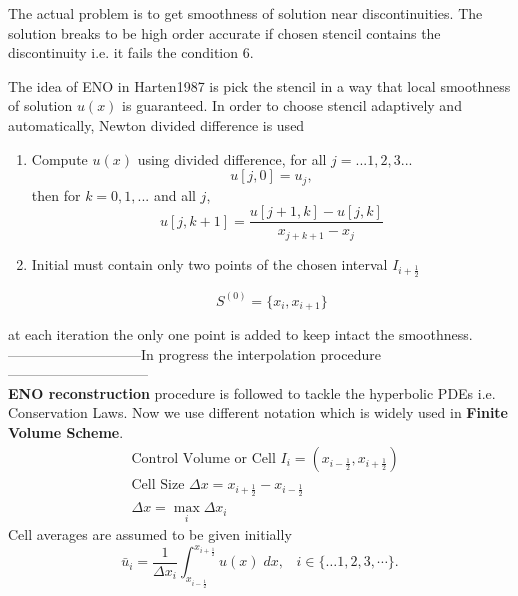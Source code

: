 \documentclass{article}
\begin{document}
\noindent The actual problem is to get smoothness of solution near discontinuities. The solution breaks to be high order accurate if chosen stencil contains the discontinuity i.e. it fails the condition 6.

\noindent The idea of ENO in Harten1987 is pick the stencil in a way that local smoothness of solution $u(x)$ is guaranteed. In order to choose stencil adaptively and automatically, Newton divided difference is used

\begin{enumerate}
    \item Compute $u(x)$ using divided difference, for all $j= ...1,2,3...$
    \begin{equation}
        u[j,0] = u_j,
    \end{equation}
    then for $k = 0,1,...$ and all $j$,
    \begin{equation}
        u[j,k+1] = \frac{u[j+1,k] - u[j,k]}{x_{j+k+1} - x_j}
    \end{equation}
    
    \item Initial must contain only two points of the chosen interval $I_{i+\frac{1}{2}}$
    
    \begin{equation}
        S^{( 0 )} = \{ x_i,x_{i+1} \}
    \end{equation}
\end{enumerate}


\noindent at each iteration the only one point is added to keep intact the smoothness.\\
-----------------------------In progress the interpolation procedure------------------------------\\

\noindent \textbf{ENO reconstruction} procedure is followed to tackle the hyperbolic PDEs i.e. Conservation Laws. Now we use different notation which is widely used in \textbf{Finite Volume Scheme}.
\begin{align}
    &\text{Control Volume or Cell } I_i = (x_{i - \frac{1}{2}},x_{i + \frac{1}{2}})\\
    &\text{Cell Size } \Delta x = x_{i + \frac{1}{2}} - x_{i - \frac{1}{2}}\\
    &  \Delta x =\max_i \Delta x_i
\end{align}
Cell averages are assumed to be given initially
\begin{equation}
     \bar{u}_{i} = \frac{1}{\Delta x_i} \int_{x_{i - \frac{1}{2}}}^{x_{i + \frac{1}{2}}} u(x)\;dx , \;\;\;i \in \{\dots1,2,3,\cdots\}.
\end{equation}
\end{document}
